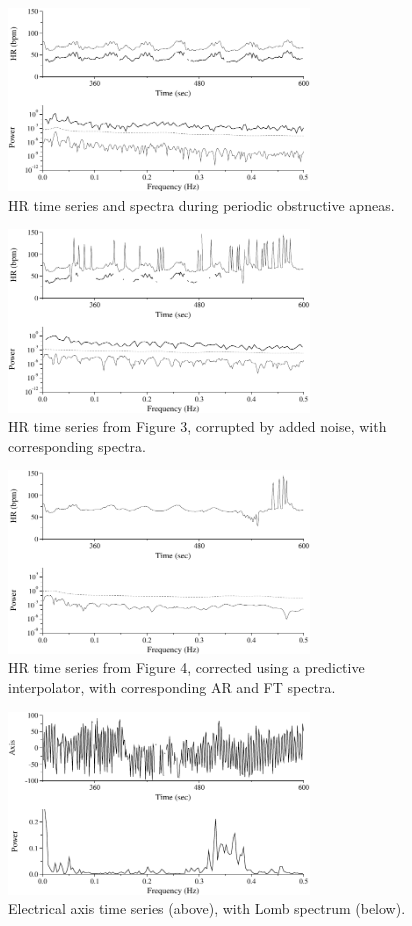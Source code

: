 \documentclass[twocolumn]{cinc}
\begin{document}
\begin{figure}[t]
    \centerline{\includegraphics[width=8cm] {figures/fig3}}
    \caption{\label{fig:apnea} HR time series and spectra during periodic
      obstructive apneas.}
\end{figure}

\begin{figure}[ht!]
    \centerline{\includegraphics[width=8cm] {figures/fig4}}
    \caption{\label{fig:noise} HR time series from Figure 3, corrupted by
      added noise, with corresponding spectra.}
\end{figure}

\begin{figure}[ht!]
    \centerline{\includegraphics[width=8cm] {figures/fig5}}
    \caption{\label{fig:corrected} HR time series from Figure 4, corrected
      using a predictive interpolator, with corresponding AR and FT
      spectra.}
\end{figure}

\begin{figure}
    \centerline{\includegraphics[width=8cm] {figures/fig6}}
    \caption{\label{fig:Lomb} Electrical axis time series (above), with Lomb
      spectrum (below).}
\end{figure}
\end{document}
